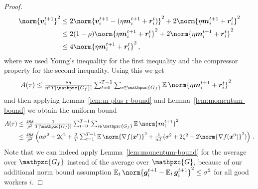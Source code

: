 \documentclass{article}
\newcommand{\gset}{\ensuremath{{\mathpzc{G}}}}
\newcommand{\gfset}{\ensuremath{{\mathpzc{G_f}}}}
\begin{document}
\begin{proof}
\begin{align*}
    \norm{\vv_i^{t+1}}^2
    &\le 
    2 \norm{\vv_i^{t+1} - (\eta \mm_i^{t+1} + \bm r_i^{t})}^2 
    +
    2 \norm{\eta \mm_i^{t+1} + \bm r_i^{t}}^2
    \\
    &\le 
    2 (1-\rho) \norm{\eta \mm_i^{t+1} + \bm r_i^{t}}^2 
    +
    2 \norm{\eta \mm_i^{t+1} + \bm r_i^{t}}^2
    \\
    &\le 
    4 \norm{\eta \mm_i^{t+1} + \bm r_i^{t}}^2 
    \, ,
  \end{align*}
  where we used Young's inequality for the first inequality and the compressor property for the second inequality. Using this we get
  \begin{align*}
  A(\tau)
  &\le 
  \tfrac{8 \delta}{\eta^2 T |\gfset|} \tsum_{t=0}^{T-1} \tsum_{i\in\gfset} \E \norm{\eta \mm_i^{t+1} + \bm r_i^{t}}^2 
  \end{align*}
  and then applying Lemma~\ref{lem:m-plus-r-bound} and Lemma~\ref{lem:momentum-bound} we obtain the uniform bound
  \begin{align*}
  A(\tau)
  &\le 
  \tfrac{48 \delta}{\rho^2} \tfrac{1}{T |\gfset|} \tsum_{t=0}^{T-1} \tsum_{i\in\gfset} \E \norm{\mm_i^{t+1}}^2 
  \\
  &\le 
  \tfrac{48 \delta}{\rho^2} 
  \left(
    \alpha \sigma^2 + 2\zeta^2 + \tfrac{2}{T} \tsum_{t=1}^{T-1} \E \norm{\nabla f(\xx^t)}^2 
    + \tfrac{1}{\alpha T}(\sigma^2 + 2 \zeta^2 + 2\norm{\nabla f(\xx^0)}^2)
  \right) \, .
  \end{align*}
  Note that we can indeed apply Lemma~\ref{lem:momentum-bound} for the average over $\gfset$ instead of the average over $\gset$, because of our additional norm bound assumption $\E_t \norm{\gg_i^{t+1} - \E_t \gg_i^{t+1}}^2 \le \sigma^2$ for all good workers $i$.
  

\end{proof}
\end{document}

